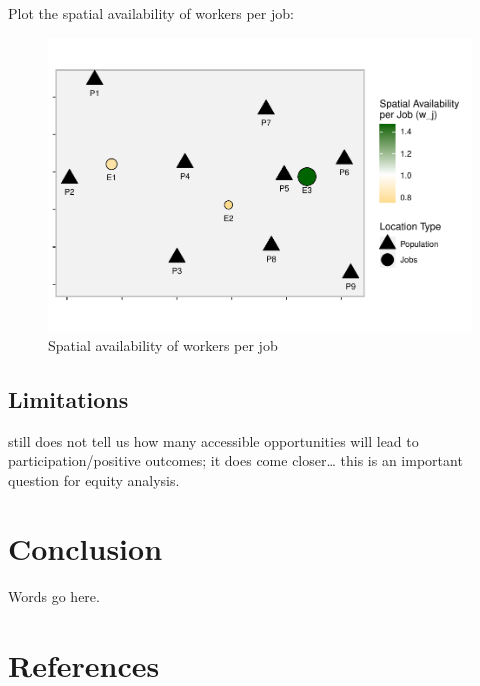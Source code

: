\documentclass[]{elsarticle} %
\begin{document}
Plot the spatial availability of workers per job:

\begin{figure}
\includegraphics[width=1\linewidth]{Spatial-Availability_files/figure-latex/toy-example-availability-workers-per-job-1} \caption{\label{fig:toy-example-availability-workers-per-job}Spatial availability of workers per job}\label{fig:toy-example-availability-workers-per-job}
\end{figure}

\hypertarget{limitations}{%
\subsection{Limitations}\label{limitations}}

still does not tell us how many accessible opportunities will lead to
participation/positive outcomes; it does come closer\ldots{} this is an
important question for equity analysis.

\hypertarget{conclusion}{%
\section{Conclusion}\label{conclusion}}

Words go here.

\hypertarget{references}{%
\section*{References}\label{references}}
\end{document}
